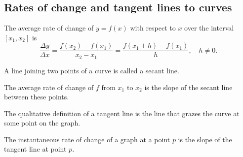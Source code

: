 \documentclass[oneside]{book}
\begin{document}
\subsection{Rates of change and tangent lines to curves}
\begin{definition}
	The average rate of change of \(y=f(x)\) with respect to \(x\) over the interval \([x_1,x_2]\) is
	\begin{equation*}
		\frac{\Delta y}{\Delta x}=\frac{f(x_2)-f(x_1)}{x_2-x_1}=\frac{f(x_1+h)-f(x_1)}{h},\quad h\neq 0.
	\end{equation*}
\end{definition}
\begin{definition}
	A line joining two points of a curve is called a secant line.
\end{definition}
\begin{remark}
	The average rate of change of \(f\) from \(x_1\) to \(x_2\) is the slope of the secant line between these points.
\end{remark}
\begin{definition}
	The qualitative definition of a tangent line is the line that grazes the curve at some point on the graph.
\end{definition}
\begin{definition}
	The instantaneous rate of change of a graph at a point \(p\) is the slope of the tangent line at point \(p\).
\end{definition}
\end{document}
